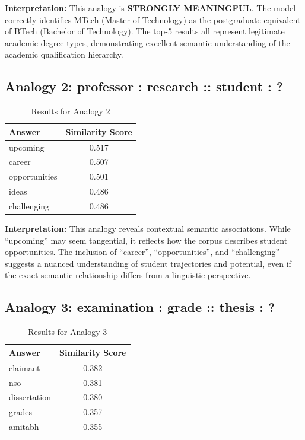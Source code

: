 \documentclass[11pt,a4paper]{report}
\begin{document}
\textbf{Interpretation:}  This analogy is \textbf{STRONGLY MEANINGFUL}. The model correctly identifies MTech (Master of Technology) as the postgraduate equivalent of BTech (Bachelor of Technology). The top-5 results all represent legitimate academic degree types, demonstrating excellent semantic understanding of the academic qualification hierarchy.

\subsection{Analogy 2: professor : research :: student : ?}

\begin{table}[H]
    \centering
    \begin{tabular}{lc}
        \toprule
        \textbf{Answer} & \textbf{Similarity Score} \\
        \midrule
        upcoming & 0.517 \\
        career & 0.507 \\
        opportunities & 0.501 \\
        ideas & 0.486 \\
        challenging & 0.486 \\
        \bottomrule
    \end{tabular}
    \caption{Results for Analogy 2}
\end{table}

\textbf{Interpretation:} This analogy reveals contextual semantic associations. While ``upcoming'' may seem tangential, it reflects how the corpus describes student opportunities. The inclusion of ``career'', ``opportunities'', and ``challenging'' suggests a nuanced understanding of student trajectories and potential, even if the exact semantic relationship differs from a linguistic perspective.

\subsection{Analogy 3: examination : grade :: thesis : ?}

\begin{table}[H]
    \centering
    \begin{tabular}{lc}
        \toprule
        \textbf{Answer} & \textbf{Similarity Score} \\
        \midrule
        claimant & 0.382 \\
        nso & 0.381 \\
        dissertation & 0.380 \\
        grades & 0.357 \\
        amitabh & 0.355 \\
        \bottomrule
    \end{tabular}
    \caption{Results for Analogy 3}
\end{table}
\end{document}
